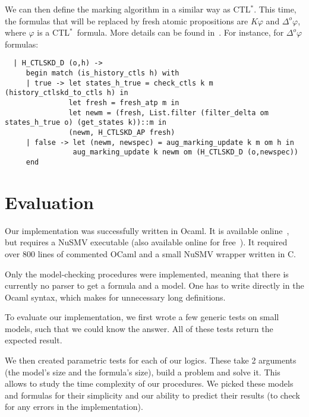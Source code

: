 \documentclass[dvipsnames]{acmart}
\def\ctls{CTL$^{*}$}
\def\K{\mathit{K}}
\def\D#1{\Delta^{#1}}
\begin{document}
We can then define the marking algorithm in a similar way as \ctls. This time, the formulas that will be replaced by fresh atomic propositions are $\K\varphi$ and $\D{o}\varphi$, where $\varphi$ is a \ctls\ formula. More details can be found in~\cite{internship}.
For instance, for $\D{o}\varphi$ formulas:
\begin{lstlisting}
  | H_CTLSKD_D (o,h) ->
     begin match (is_history_ctls h) with
     | true -> let states_h_true = check_ctls k m (history_ctlskd_to_ctls h) in
               let fresh = fresh_atp m in
               let newm = (fresh, List.filter (filter_delta om states_h_true o) (get_states k))::m in
               (newm, H_CTLSKD_AP fresh)
     | false -> let (newm, newspec) = aug_marking_update k m om h in
                aug_marking_update k newm om (H_CTLSKD_D (o,newspec))
     end
\end{lstlisting}


\section{Evaluation}
Our implementation was successfully written in Ocaml. It is available online~\cite{ctlskd_mc}, but requires a NuSMV executable (also available online for free~\cite{get_nusmv}). It required over 800 lines of commented OCaml and a small NuSMV wrapper written in C.

Only the model-checking procedures were implemented, meaning that there is currently no parser to get a formula and a model. One has to write directly in the Ocaml syntax, which makes for unnecessary long definitions.

To evaluate our implementation, we first wrote a few generic tests on small models, such that we could know the answer.
All of these tests return the expected result.

We then created parametric tests for each of our logics. These take 2 arguments (the model's size and the formula's size), build a problem and solve it. This allows to study the time complexity of our procedures. We picked these models and formulas for their simplicity and our ability to predict their results (to check for any errors in the implementation).
\end{document}
